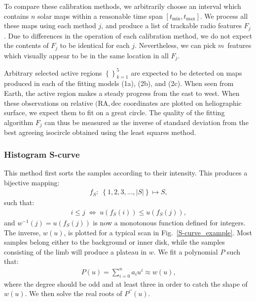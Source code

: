 \documentclass{aa}
\newcommand{\eqnl}[2]{\begin{eqnarray}\label{#1}#2\end{eqnarray}}
\newcommand{\s}[2]{{#1}_{\mathrm{#2}}}
\begin{document}
To compare these calibration methods, we arbitrarily choose an interval which contains $n$ solar maps within a 
reasonable time span $[\s{t}{min},\s{t}{max}]$. We process all these maps using each method $j$, and produce a list of 
trackable radio features $F_j$. Due to differences in the operation of each calibration method, we do not expect the 
contents of $F_j$ to be identical for each $j$. Nevertheless, we can pick $m$ features which visually appear to be in 
the same location in all $F_j$.

Arbitrary selected active regions $\left\{ \right\}_{k=1}^{5}$ are expected to be detected on maps produced in each of 
the fitting models (1a), (2b), and (2c). When seen from Earth, the active region makes a steady progress from 
the east 
to west. When these observations on relative $(\mathrm{RA}, \mathrm{dec}$ coordinates are plotted on heliographic 
surface, we expect them to fit on a great
circle. The quality of the fitting algorithm $F_j$ can thus be measured as the 
inverse of standard deviation from the best agreeing isocircle obtained using the 
least squares method.

\subsubsection{Histogram S-curve}


This method first sorts the samples according to their intensity. This produces a bijective mapping:
\eqnl{scurve-mapping1}{
f_S:\; \left\{ 1, 2, 3, ..., |S| \right\} \mapsto S \text{,}
}
such that:
\eqnl{scurve-mapping2}{
i \le j \; \Leftrightarrow \; u \left( f_S(i) \right) \le u \left( f_S(j) \right) \text{,} 
}
and $w^{-1}(j) = u(f_S(j))$ is now a monotonous function defined for integers. The inverse, $w(u)$, is plotted for a typical scan in 
Fig.~\ref{S-curve_example}. 
Most samples belong either to the background or inner disk, while the samples consisting of the limb will produce a plateau in $w$.
We fit a polynomial $P$ such that:
\eqnl{scurve-approx}{
P(u) = \sum \limits_{i=0}^{n} a_i u^i \approx w(u) \text{,}
}
where the degree should be odd and at least three in order to catch the shape of $w(u)$. We then solve the real roots of $P^{\prime\prime}(u)$.
\end{document}
